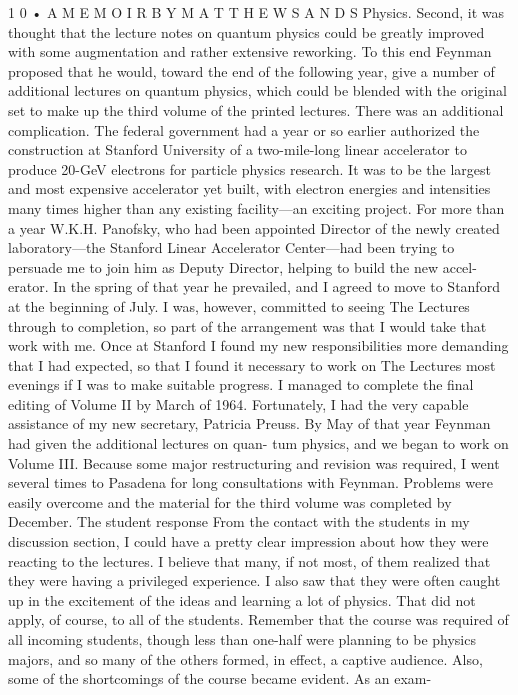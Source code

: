 \documentclass[11pt,oneside]{article}
\begin{document}
1 0 • A  M E M O I R  B Y  M A T T H E W  S A N D S Physics. Second, it was thought that the lecture notes on quantum physics could be greatly improved with some augmentation and rather extensive reworking. To this end Feynman proposed that he would, toward the end of the following year, give a number of additional lectures on quantum physics, which could be blended with the original set to make up the third volume of the printed lectures. There was an additional complication. The federal government had a year or so earlier authorized the construction at Stanford University of a two-mile-long linear accelerator to produce 20-GeV electrons for particle physics research. It was to be the largest and most expensive accelerator yet built, with electron energies and intensities many times higher than any existing facility---an exciting project. For more than a year W.K.H. Panofsky, who had been appointed Director of the newly created laboratory---the Stanford Linear Accelerator Center---had been trying to persuade me to join him as Deputy Director, helping to build the new accel- erator. In the spring of that year he prevailed, and I agreed to move to Stanford at the beginning of July. I was, however, committed to seeing The Lectures through to completion, so part of the arrangement was that I would take that work with me. Once at Stanford I found my new responsibilities more demanding that I had expected, so that I found it necessary to work on The Lectures most evenings if I was to make suitable progress. I managed to complete the final editing of Volume II by March of 1964. Fortunately, I had the very capable assistance of my new secretary, Patricia Preuss. By May of that year Feynman had given the additional lectures on quan- tum physics, and we began to work on Volume III. Because some major restructuring and revision was required, I went several times to Pasadena for long consultations with Feynman. Problems were easily overcome and the material for the third volume was completed by December. The student response From the contact with the students in my discussion section, I could have a pretty clear impression about how they were reacting to the lectures. I believe that many, if not most, of them realized that they were having a privileged experience. I also saw that they were often caught up in the excitement of the ideas and learning a lot of physics. That did not apply, of course, to all of the students. Remember that the course was required of all incoming students, though less than one-half were planning to be physics majors, and so many of the others formed, in effect, a captive audience. Also, some of the shortcomings of the course became evident. As an exam-\par
\end{document}
